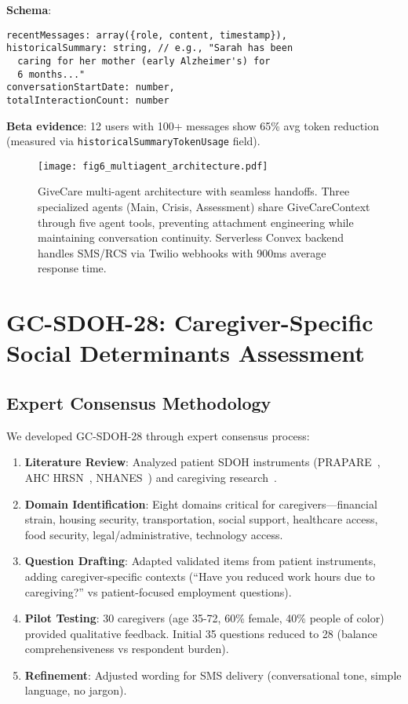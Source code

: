 \documentclass{article}
\begin{document}
\textbf{Schema}:
\begin{verbatim}
recentMessages: array({role, content, timestamp}),
historicalSummary: string, // e.g., "Sarah has been
  caring for her mother (early Alzheimer's) for
  6 months..."
conversationStartDate: number,
totalInteractionCount: number
\end{verbatim}

\textbf{Beta evidence}: 12 users with 100+ messages show 65\% avg token reduction (measured via \texttt{historicalSummaryTokenUsage} field).

%
\begin{figure}[htbp]%
\centering%
\texttt{[image: fig6\_multiagent\_architecture.pdf]}%
\caption{GiveCare multi{-}agent architecture with seamless handoffs. Three specialized agents (Main, Crisis, Assessment) share GiveCareContext through five agent tools, preventing attachment engineering while maintaining conversation continuity. Serverless Convex backend handles SMS/RCS via Twilio webhooks with 900ms average response time.}%
\label{fig:multiagent}%
\end{figure}%
\section{GC{-}SDOH{-}28: Caregiver{-}Specific Social Determinants Assessment}%
\label{sec:GC{-}SDOH{-}28Caregiver{-}SpecificSocialDeterminantsAssessment}%
%
\subsection{Expert Consensus Methodology}%
\label{subsec:ExpertConsensusMethodology}%
We developed GC-SDOH-28 through expert consensus process:
\begin{enumerate}
    \item \textbf{Literature Review}: Analyzed patient SDOH instruments (PRAPARE~\cite{prapare}, AHC HRSN~\cite{ahc}, NHANES~\cite{nhanes}) and caregiving research~\cite{aarp2025, bella2006, tebb1999}.
    \item \textbf{Domain Identification}: Eight domains critical for caregivers—financial strain, housing security, transportation, social support, healthcare access, food security, legal/administrative, technology access.
    \item \textbf{Question Drafting}: Adapted validated items from patient instruments, adding caregiver-specific contexts (``Have you reduced work hours due to caregiving?'' vs patient-focused employment questions).
    \item \textbf{Pilot Testing}: 30 caregivers (age 35-72, 60\% female, 40\% people of color) provided qualitative feedback. Initial 35 questions reduced to 28 (balance comprehensiveness vs respondent burden).
    \item \textbf{Refinement}: Adjusted wording for SMS delivery (conversational tone, simple language, no jargon).
\end{enumerate}
\end{document}
